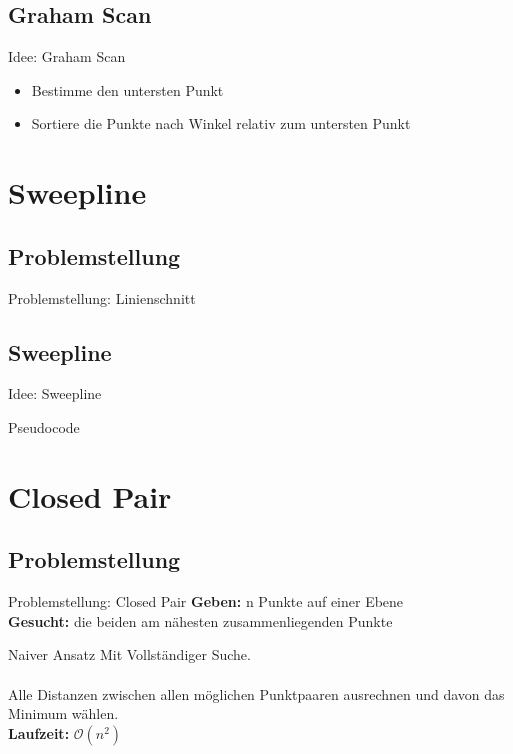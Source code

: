 \documentclass[18pt]{beamer}
\begin{document}
	
	\subsection{Graham Scan}
		\begin{frame}{Idee: Graham Scan}
			\begin{itemize}
				\item Bestimme den untersten Punkt 
				\item Sortiere die Punkte nach Winkel relativ zum untersten Punkt
			\end{itemize}
		\end{frame}
	


\section{Sweepline}

	\subsection{Problemstellung}
		\begin{frame}{Problemstellung: Linienschnitt}
		\end{frame}
	
	\subsection{Sweepline}
		\begin{frame}{Idee: Sweepline}
	
		\end{frame}
	
		\begin{frame}{Pseudocode}
	
		\end{frame}
	
\section{Closed Pair}

	\subsection{Problemstellung}
		\begin{frame}{Problemstellung: Closed Pair}
			\textbf{Geben:} n Punkte auf einer Ebene \\
			\textbf{Gesucht:} die beiden am nähesten zusammenliegenden Punkte\\
		
			\begin{block}{Naiver Ansatz}
				Mit Vollständiger Suche. \\
				\ \\
				Alle Distanzen zwischen allen möglichen Punktpaaren ausrechnen und davon das Minimum wählen. 
				\ \\
				\textbf{Laufzeit:} $\mathcal{O}(n^2)$
			\end{block}	
		\end{frame}
	
\end{document}
